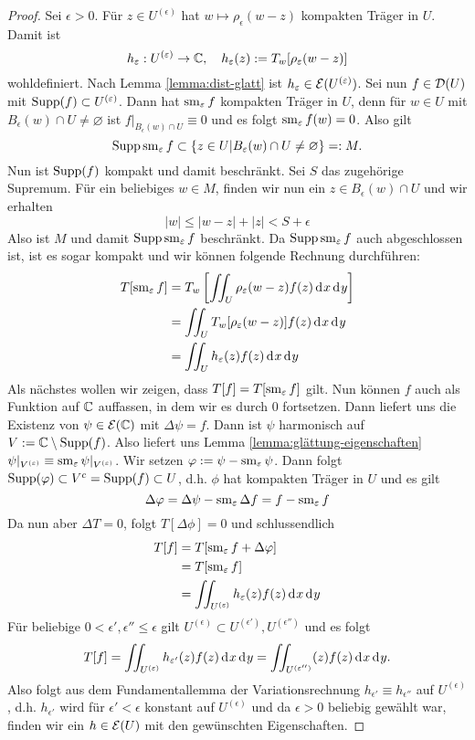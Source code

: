 \begin{proof}
  Sei $\epsilon > 0$. Für $z \in U^{(\epsilon)}$ hat $w \mapsto
  \rho_\epsilon(w - z)$ kompakten Träger in $U$. Damit ist
  \[
  h_\varepsilon : U^{(\varepsilon)} \rightarrow \mathbb{C}, \quad h_\varepsilon(z) :=
  T_w[\rho_\varepsilon(w - z)]
  \]
  wohldefiniert. Nach Lemma \ref{lemma:dist-glatt} ist $h_\varepsilon \in
  \mathcal{E}(U^{(\varepsilon)})$. 
  Sei nun $f \in \mathcal{D}(U)$ mit $\operatorname{Supp}(f) \subset U^{(\varepsilon)}$. Dann
  hat $\operatorname{sm}_\varepsilon f$ kompakten Träger in $U$, denn für $w \in U$ mit
  $B_\epsilon(w) \cap U \neq \varnothing$ ist $f|_{B_\epsilon(w) \cap U}
  \equiv 0$ und es folgt $\operatorname{sm}_\varepsilon f(w) = 0$. Also gilt
  \[
  \operatorname{Supp} \operatorname{sm}_\varepsilon f \subset \{ z \in U | B_\varepsilon(w) \cap U \neq
  \varnothing\} =: M.
  \]
  Nun ist $\operatorname{Supp}(f)$ kompakt und damit
  beschränkt. Sei $S$ das zugehörige Supremum. Für ein beliebiges $w
  \in M$, finden wir nun ein $z \in B_\epsilon(w) \cap U$ und wir
  erhalten
  \[
  |w| \leq |w-z| + |z| < S + \epsilon
  \]
  Also ist $M$ und damit $\operatorname{Supp} \operatorname{sm}_\varepsilon f$ beschränkt. Da $\operatorname{Supp}
  \operatorname{sm}_\varepsilon f$ auch abgeschlossen ist, ist es sogar kompakt und wir können folgende
  Rechnung durchführen:
  \begin{align}
    T[\sm_\epsilon f] & = T_w \left [ \iint_U \rho_\epsilon(w - z)
      f(z) \d[x]\d[y] \right ] \nonumber \\
    & = \iint_U T_w[\rho_\epsilon(w-z)] f(z)
    \d[x]\d[y] \label{eq:weyl} \\
    & = \iint_U h_\epsilon(z) f(z) \d[x]\d[y] \nonumber
  \end{align}
  Als nächstes wollen wir zeigen, dass $T[f] = T[\operatorname{sm}_\varepsilon f]$
  gilt. Nun können $f$ auch als Funktion auf $\mathbb{C}$ auffassen, in dem
  wir es durch 0 fortsetzen. Dann liefert uns \cite[Kor. 13.3]{For} die
  Existenz von $\psi \in \mathcal{E}(\mathbb{C})$ mit $\Delta \psi = f$. 
  Dann ist $\psi$ harmonisch auf $V:= \mathbb{C} \setminus \operatorname{Supp}(f)$. Also
  liefert uns Lemma \ref{lemma:glättung-eigenschaften} $\psi|_{V^{(\varepsilon)}}
  \equiv \operatorname{sm}_\varepsilon \psi|_{V^{(\varepsilon)}}$. Wir setzen $\varphi := \psi -
  \operatorname{sm}_\varepsilon\psi$. Dann folgt $\operatorname{Supp}(\varphi) \subset V^c = \operatorname{Supp}(f)
  \subset U$, d.h. $\phi$ hat kompakten Träger in $U$ und es gilt
  \[
  \Delta \varphi = \Delta \psi - \operatorname{sm}_\varepsilon \Delta f = f - \operatorname{sm}_\varepsilon
  f
  \]
  Da nun aber $\Delta T = 0$, folgt $T[\Delta \phi] = 0$ und
  schlussendlich
  \begin{align*}
    T[f] & = T[\sm_\epsilon f + \Delta \phi] \\
    & = T[\sm_\epsilon f] \\
    & = \iint_{U^{(\epsilon)}} h_\epsilon(z) f(z) \d[x]\d[y]
  \end{align*}
  Für beliebige $0 < \epsilon', \epsilon'' \leq \epsilon$ gilt
  $U^{(\epsilon)} \subset U^{(\epsilon')}, U^{(\epsilon'')}$ und es
  folgt
  \[
  T[f] = \iint_{U^{(\epsilon)}}h_{\epsilon'}(z) f(z) \d[x]\d[y] =
  \iint_{U^{(\epsilon'')}}(z) f(z) \d[x] \d[y].
  \]
  Also folgt aus dem Fundamentallemma der Variationsrechnung
  $h_{\epsilon'} \equiv h_{\epsilon''}$ auf $U^{(\epsilon)}$,
  d.h. $h_{\epsilon'}$ wird für $\epsilon' < \epsilon$ konstant auf
  $U^{(\epsilon)}$ und da $\epsilon > 0$ beliebig gewählt war, finden
  wir ein $h \in \mathcal{E}(U)$ mit den gewünschten Eigenschaften.
\end{proof}

